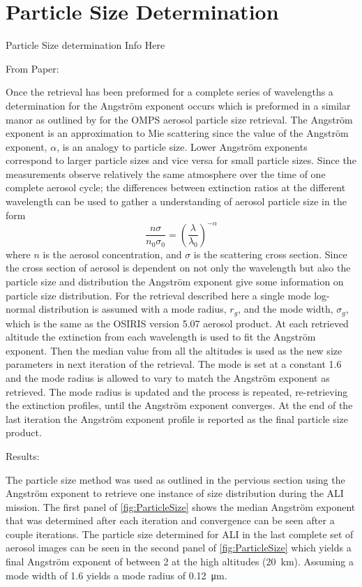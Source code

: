 \section{Particle Size Determination}

Particle Size determination Info Here

From Paper:

Once the retrieval has been preformed for a complete series of wavelengths a determination for the Angstr\"{o}m exponent occurs which is preformed in a similar manor as outlined by \cite{Rault2013} for the OMPS aerosol particle size retrieval. The Angstr\"{o}m exponent is an approximation to Mie scattering since the value of the Angstr\"{o}m exponent, $\alpha$, is an analogy to particle size. Lower Angstr\"{o}m exponents correspond to larger particle sizes and vice versa for small particle sizes. Since the measurements observe relatively the same atmosphere over the time of one complete aerosol cycle; the differences between extinction ratios at the different wavelength can be used to gather a understanding of aerosol particle size in the form
\begin{equation}
    \frac{n\sigma}{n_{0}\sigma_{0}} = \left(\frac{\lambda}{\lambda_{0}}\right)^{-\alpha}
    \label{eqn:agstromCoefficient}
\end{equation}
where $n$ is the aerosol concentration, and $\sigma$ is the scattering cross section. Since the cross section of aerosol is dependent on not only the wavelength but also the particle size and distribution the Angstr\"{o}m exponent give some information on particle size distribution. For the retrieval described here a single mode log-normal distribution is assumed with a mode radius, $r_{g}$, and the mode width, $\sigma_{g}$, which is the same as the OSIRIS version 5.07 aerosol product. At each retrieved altitude the extinction from each wavelength is used to fit the Angstr\"{o}m exponent. Then the median value from all the altitudes is used as the new size parameters in next iteration of the retrieval. The mode is set at a constant 1.6 and the mode radius is allowed to vary to match the Angstr\"{o}m exponent as retrieved. The mode radius is updated and the process is repeated, re-retrieving the extinction profiles, until the Angstr\"{o}m exponent converges. At the end of the last iteration the Angstr\"{o}m exponent profile is reported as the final particle size product.

Results:

The particle size method was used as outlined in the pervious section using the Angstr\"{o}m exponent to retrieve one instance of size distribution during the ALI mission. The first panel of \autoref{fig:ParticleSize} shows the median Angstr\"{o}m exponent that was determined after each iteration and convergence can be seen after a couple iterations. The particle size determined for ALI in the last complete set of aerosol images can be seen in the second panel of \autoref{fig:ParticleSize} which yields a final Angstr\"{o}m exponent of between 2 at the high altitudes (20~km). Assuming a mode width of 1.6 yields a mode radius of 0.12~\si{\micro\metre}.

